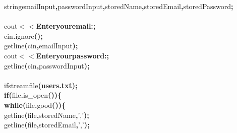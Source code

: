 \documentclass[a4paper, 17pt]{article}
\newcommand\SPC{\hspace*{0.6em}}
\newcommand\QOT{\mbox{\char 34}}
\newcommand{\CppACharacter}[1]{#1}
\newcommand{\CppAIdentifier}[1]{#1}
\newcommand{\CppAReservedWord}[1]{\textbf{#1}}
\newcommand{\CppASpace}[1]{\colorbox[rgb]{1,1,1}{#1}}
\newcommand{\CppAString}[1]{\textbf{\textcolor[rgb]{0,0,1}{#1}}}
\newcommand{\CppASymbol}[1]{\textbf{\textcolor[rgb]{1,0,0}{#1}}}
\begin{document}
\begin{ttfamily}
\CppASpace{\SPC \SPC \SPC \SPC }\CppAIdentifier{string}\CppASpace{\SPC }\CppAIdentifier{emailInput}\CppASymbol{,}\CppASpace{\SPC }\CppAIdentifier{passwordInput}\CppASymbol{,}\CppASpace{\SPC }\CppAIdentifier{storedName}\CppASymbol{,}\CppASpace{\SPC }\CppAIdentifier{storedEmail}\CppASymbol{,}\CppASpace{\SPC }\CppAIdentifier{storedPassword}\CppASymbol{;}\\
\\
\CppASpace{\SPC \SPC \SPC \SPC }\CppAIdentifier{cout}\CppASpace{\SPC }\CppASymbol{$<$$<$}\CppASpace{\SPC }\CppAString{\QOT Enter\SPC your\SPC email:\SPC \QOT }\CppASymbol{;}\\
\CppASpace{\SPC \SPC \SPC \SPC }\CppAIdentifier{cin}\CppASymbol{.}\CppAIdentifier{ignore}\CppASymbol{(}\CppASymbol{)}\CppASymbol{;}\\
\CppASpace{\SPC \SPC \SPC \SPC }\CppAIdentifier{getline}\CppASymbol{(}\CppAIdentifier{cin}\CppASymbol{,}\CppASpace{\SPC }\CppAIdentifier{emailInput}\CppASymbol{)}\CppASymbol{;}\\
\CppASpace{\SPC \SPC \SPC \SPC }\CppAIdentifier{cout}\CppASpace{\SPC }\CppASymbol{$<$$<$}\CppASpace{\SPC }\CppAString{\QOT Enter\SPC your\SPC password:\SPC \QOT }\CppASymbol{;}\\
\CppASpace{\SPC \SPC \SPC \SPC }\CppAIdentifier{getline}\CppASymbol{(}\CppAIdentifier{cin}\CppASymbol{,}\CppASpace{\SPC }\CppAIdentifier{passwordInput}\CppASymbol{)}\CppASymbol{;}\\
\\
\CppASpace{\SPC \SPC \SPC \SPC }\CppAIdentifier{ifstream}\CppASpace{\SPC }\CppAIdentifier{file}\CppASymbol{(}\CppAString{\QOT users.txt\QOT }\CppASymbol{)}\CppASymbol{;}\\
\CppASpace{\SPC \SPC \SPC \SPC }\CppAReservedWord{if}\CppASpace{\SPC }\CppASymbol{(}\CppAIdentifier{file}\CppASymbol{.}\CppAIdentifier{is\_open}\CppASymbol{(}\CppASymbol{)}\CppASymbol{)}\CppASpace{\SPC }\CppASymbol{\{}\\
\CppASpace{\SPC \SPC \SPC \SPC \SPC \SPC \SPC \SPC }\CppAReservedWord{while}\CppASpace{\SPC }\CppASymbol{(}\CppAIdentifier{file}\CppASymbol{.}\CppAIdentifier{good}\CppASymbol{(}\CppASymbol{)}\CppASymbol{)}\CppASpace{\SPC }\CppASymbol{\{}\\
\CppASpace{\SPC \SPC \SPC \SPC \SPC \SPC \SPC \SPC \SPC \SPC \SPC \SPC }\CppAIdentifier{getline}\CppASymbol{(}\CppAIdentifier{file}\CppASymbol{,}\CppASpace{\SPC }\CppAIdentifier{storedName}\CppASymbol{,}\CppASpace{\SPC }\CppACharacter{','}\CppASymbol{)}\CppASymbol{;}\\
\CppASpace{\SPC \SPC \SPC \SPC \SPC \SPC \SPC \SPC \SPC \SPC \SPC \SPC }\CppAIdentifier{getline}\CppASymbol{(}\CppAIdentifier{file}\CppASymbol{,}\CppASpace{\SPC }\CppAIdentifier{storedEmail}\CppASymbol{,}\CppASpace{\SPC }\CppACharacter{','}\CppASymbol{)}\CppASymbol{;}\\

\end{ttfamily}
\end{document}
